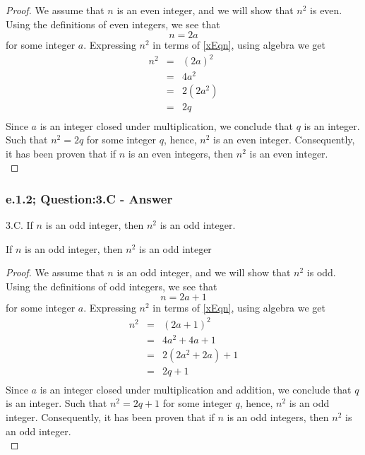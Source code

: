 \begin{proof}
We assume that $n$ is an even integer, and we will show that $n^2$ is even. Using the definitions of even integers, we see that
\begin{equation}
\label{xEqn}
n = 2a
\end{equation}
for some integer $a$. Expressing $n^2$ in terms of \ref{xEqn}, using algebra we get
\begin{eqnarray*}
n^2 & = & (2a)^2  \nonumber \\
& = & 4a^2 \nonumber \\
& = & 2(2a^2) \nonumber \\
& = & 2q \nonumber \\
\end{eqnarray*}
Since $a$ is an integer closed under multiplication, we conclude that $q$ is an integer. Such that $n^2 = 2q$ for some integer $q$, hence, $n^2$ is an even integer. Consequently, it has been proven that if $n$ is an even integers, then $n^2$ is an even integer. \\
\end{proof}


\subsubsection*{e.1.2; Question:3.C - Answer}
3.C. If $n$ is an odd integer, then $n^2$ is an odd integer. \\

\begin{tcolorbox}
\begin{theorem}
If $n$ is an odd integer, then $n^2$ is an odd integer
\end{theorem}
\end{tcolorbox}

\begin{proof}
We assume that $n$ is an odd integer, and we will show that $n^2$ is odd. Using the definitions of odd integers, we see that
\begin{equation}
\label{xEqn}
n = 2a + 1
\end{equation}
for some integer $a$. Expressing $n^2$ in terms of \ref{xEqn}, using algebra we get
\begin{eqnarray*}
n^2 & = & (2a + 1)^2  \nonumber \\
& = & 4a^2 + 4a + 1 \nonumber \\
& = & 2(2a^2 + 2a) + 1 \nonumber \\
& = & 2q + 1 \nonumber \\
\end{eqnarray*}
Since $a$ is an integer closed under multiplication and addition, we conclude that $q$ is an integer. Such that $n^2 = 2q + 1$ for some integer $q$, hence, $n^2$ is an odd integer. Consequently, it has been proven that if $n$ is an odd integers, then $n^2$ is an odd integer. \\
\end{proof}



